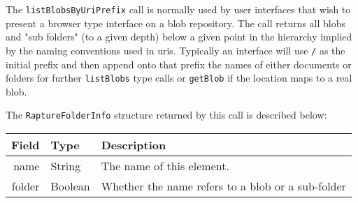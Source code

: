 The \verb+listBlobsByUriPrefix+ call is normally used by user interfaces that wish
to present a browser type interface on a blob repository. The call returns all blobs
and "sub folders" (to a given depth) below a given point in the hierarchy implied
by the naming conventions used in uris. Typically an interface will use \verb+/+ as
the initial prefix and then append onto that prefix the names of either documents
or folders for further \verb+listBlobs+ type calls or \verb+getBlob+ if the location
maps to a real blob.

The \verb+RaptureFolderInfo+ structure returned by this call is described below:

\begin{table}[ht]
\begin{center}
\begin{tabular}{r l p{8cm}}
  Field & Type & Description \\
  \hline
  name & String & The name of this element. \\
  folder & Boolean & Whether the name refers to a blob or a sub-folder \\
\end{tabular}
\end{center}
\end{table}
